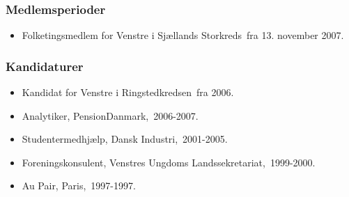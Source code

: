 \documentclass[11pt, a4paper]{awesome-cv}
\begin{document}
\begin{cvletter}
\subsubsection*{Medlemsperioder}
\begin{itemize}
\item Folketingsmedlem for Venstre i Sjællands Storkreds fra 13. november 2007.
\end{itemize}
\subsubsection*{Kandidaturer}
\begin{itemize}
\item Kandidat for Venstre i Ringstedkredsen fra 2006.
\end{itemize}
\begin{itemize}
\item Analytiker, PensionDanmark, 2006-2007.
\item Studentermedhjælp, Dansk Industri, 2001-2005.
\item Foreningskonsulent, Venstres Ungdoms Landssekretariat, 1999-2000.
\item Au Pair, Paris, 1997-1997.
\end{itemize}
\end{cvletter}
\end{document}
